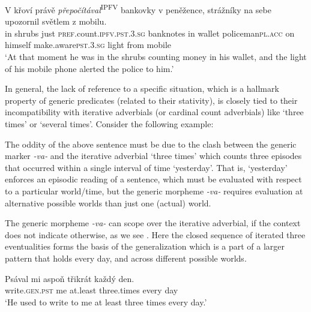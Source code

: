 \documentclass[output=paper,colorlinks,citecolor=brown]{langscibook}
\begin{document}
\ea \label{sec.IPFV.prog}
\gll V křoví právě \textit{přepočítával}\textsuperscript{IPFV} bankovky v peněžence, strážníky na sebe upozornil světlem z mobilu.\\
in shrubs just \textsc{pref}.count.\textsc{ipfv.pst.3.sg} banknotes in wallet policeman\textsc{pl.acc}  on himself make.aware\textsc{pst.3.sg} light from mobile\\
\glt `At that moment he was in the shrubs counting money in his wallet, and the light of his mobile phone alerted the police to him.'
\z


In general, the lack of reference to a specific situation, which is a hallmark property of generic predicates (related to  their stativity), is closely tied to their incompatibility
with iterative adverbials (or cardinal count adverbials) like `three times' or `several times'. Consider the following example:

\z

\noindent The oddity of the above sentence must be due to the clash between the generic marker \textit{-va-} and the iterative adverbial
`three times' which counts three episodes that occurred within a single interval of time `yesterday'. That is, `yesterday' enforces an episodic reading of a sentence, which must be evaluated with respect to a particular world/time,
but the generic morpheme \textit{-va-} requires evaluation at alternative possible worlds than just one (actual) world.

The generic morpheme \textit{-va-} can scope over the iterative adverbial, if the context does not indicate otherwise, as we see . Here the closed sequence of iterated three eventualities forms the basis of the generalization which is a part of a larger pattern
that holds every day, and across different possible worlds.

\ea\label{filip:ex:write-three}\gll Psával mi aspoň třikrát každý den. \\
write.\textsc{gen.pst} me at.least three.times every day\\
\glt `He used to write to me at least three times every day.'
\z
\end{document}
